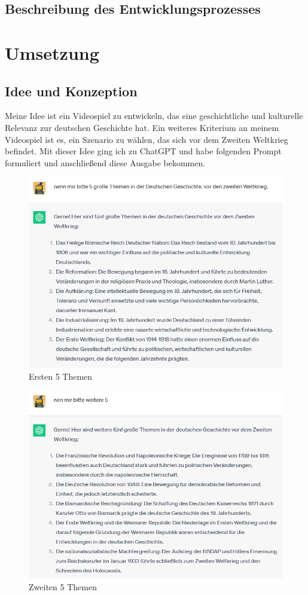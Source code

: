 \documentclass[12pt,a4paper,bibliography=totocnumbered,listof=totocnumbered]{scrartcl}
\begin{document}
\subsection{Beschreibung des Entwicklungsprozesses}
\section{Umsetzung}
\subsection {Idee und Konzeption}
Meine Idee ist ein Videospiel zu entwickeln, das eine geschichtliche und kulturelle Relevanz zur deutschen Geschichte hat. Ein weiteres Kriterium an meinem Videospiel ist es, ein Szenario zu wählen, das sich vor dem Zweiten Weltkrieg befindet. Mit dieser Idee ging ich zu ChatGPT und habe folgenden Prompt formuliert und anschließend diese Ausgabe bekommen.
\begin{figure}[h]
	\centering
	\includegraphics[scale=0.7]{BilderFuerBA/CGPTBachelorarbeitZurKI/01.png}
	\caption{Ersten 5 Themen}
	\label{fig:ersten-5-themen}
\end{figure}
\begin{figure}[h]
	\centering
	\includegraphics[scale=0.7]{BilderFuerBA/CGPTBachelorarbeitZurKI/02.png}
	\caption{Zweiten 5 Themen}
	\label{fig:zweiten-5-themen}
\end{figure}
\end{document}

